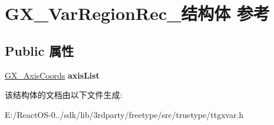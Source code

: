 \hypertarget{struct_g_x___var_region_rec__}{}\section{G\+X\+\_\+\+Var\+Region\+Rec\+\_\+结构体 参考}
\label{struct_g_x___var_region_rec__}
\subsection*{Public 属性}
\begin{DoxyCompactItemize}
\item 
\mbox{\label{struct_g_x___var_region_rec___a65cd56c168e1935bf05c46eda731b2df}} 
\hyperlink{struct_g_x___axis_coords_rec__}{G\+X\+\_\+\+Axis\+Coords} {\bfseries axis\+List}
\end{DoxyCompactItemize}


该结构体的文档由以下文件生成\+:\begin{DoxyCompactItemize}
\item 
E\+:/\+React\+O\+S-\/0../sdk/lib/3rdparty/freetype/src/truetype/ttgxvar.\+h\end{DoxyCompactItemize}
